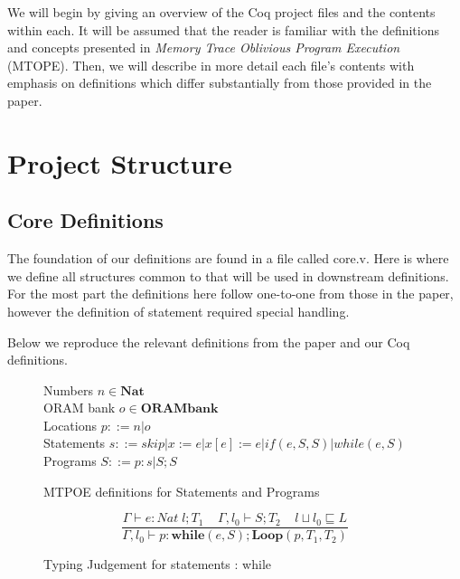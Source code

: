 \documentclass[10pt,  onecolumn]{article}
\begin{document}
We will begin by giving an overview of the Coq project files and the contents within each.
It will be assumed that the reader is familiar with the definitions and concepts presented in \emph{Memory Trace Oblivious Program Execution} (MTOPE).
Then, we will describe in more detail each file's contents with emphasis on definitions which differ substantially from those provided in the paper.


\section{ Project Structure }



	\subsection{ Core Definitions }
	The foundation of our definitions are found in a file called core.v.
	Here is where we define all structures common to that will be used in downstream definitions.
	For the most part the definitions here follow one-to-one from those in the paper, however the definition of statement required special handling.

	Below we reproduce the relevant definitions from the paper and our Coq definitions.


\begin{figure}
\caption{ MTPOE definitions for Statements and Programs }
\label{fig:mto_rule_while}

	\begin{mdframed}
	Numbers $n \in \textbf{Nat}$\\
	ORAM bank $o \in \textbf{ORAMbank}$\\
	Locations $p ::= n | o$\\
	Statements $ s ::= skip | x := e | x[e] := e | if(e, S, S) | while(e, S)$\\
	Programs $ S ::= p:s | S;S$
	\end{mdframed}

\end{figure}

\begin{figure}
\caption{ Typing Judgement for statements : while}
\label{fig:while_judgement}
\[
\frac{ \Gamma \vdash e : Nat \; l; T_{1}   \;\;\;\;  \Gamma, l_{0} \vdash S;T_{2}  \;\;\;\;   l \sqcup l_{0} \sqsubseteq L }
	{ \Gamma, l_{0} \vdash p:\textbf{while}(e,S);\textbf{Loop}(p,T_{1},T_{2}) }
\]
\end{figure}
\end{document}
